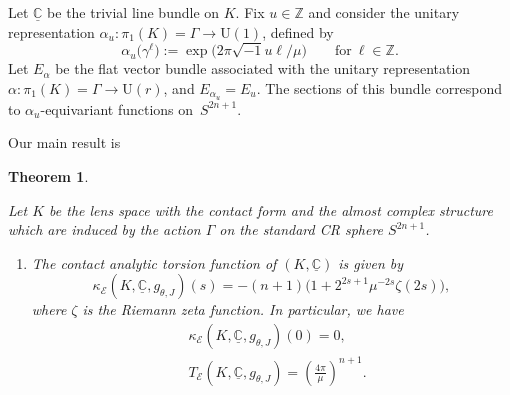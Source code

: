 \documentclass[pdftex]{sigma}
\numberwithin{equation}{section}
\newtheorem{Theorem}{Theorem}[section]
\newcommand{\ii}{\sqrt{-1}}
\newcommand{\RN}{\cE}
\newcommand{\bC}{\mathbb{C}}
\newcommand{\cE}{\mathcal{E}}
\begin{document}
Let $\underline{\bC}$ be the trivial line bundle on $K$.
Fix $u \in \mathbb{Z}$ and consider the unitary representation $\alpha_u \colon \pi_1 (K) = \Gamma \to \mathrm{U} (1)$, defined by
\[
 \alpha_u \big( \gamma^{\ell} \big) := \exp \big( 2 \pi \ii u \ell / \mu \big)
 \qquad \text{for} \ \ell \in \mathbb{Z}
 .
\]
Let $E_{\alpha}$ be the flat vector bundle associated with the unitary representation ${\alpha \colon \pi_1 (K) = \Gamma \! \to \! \mathrm{U} (r)}$, and $E_{\alpha_u} = E_{u}$.
The sections of this bundle correspond to $\alpha_u$-equivariant functions on~$S^{2n+1}$.


Our main result is
\begin{Theorem}
\label{theo:compute-precisely-kappa-on-the-lens-spaces}

Let $K$ be the lens space with
the contact form and the almost complex structure which are induced by the action $\Gamma$ on the standard CR sphere $S^{2n+1}$.
\begin{enumerate}\itemsep=0pt
\item[$(1)$]
 The contact analytic torsion function
 of $(K, \underline{\bC})$
 is given by
 \begin{equation}
 \kappa_\RN ( K , \underline{\bC}, g_{\theta , J} ) (s)
 =
 -(n+1)
 \bigr(
 1
 +
 2^{2s+1}
 \mu^{-2s}
 \zeta (2s)
 \bigl)
 ,
 \label{eq:kappa-on-lens-spaces}
 \end{equation}
 where $\zeta$ is the Riemann zeta function.
 In particular, we have
 \begin{align}
 & \kappa_\RN ( K , \underline{\bC} , g_{\theta , J} ) (0)
 =
 0
 ,
 \label{eq:kappa-at-the-origin-of-the-triv-bundle-on-lens-spaces}
 \\
 & T_\RN ( K , \underline{\bC}, g_{\theta , J} )
 =
 \left(\frac{4 \pi}{\mu}\right)^{n+1}
 .
 \label{eq:Rumin-analytic-torsion-of-the-triv-bundle-on-lens-spaces}
 \end{align}


\end{enumerate}
\end{Theorem}
\end{document}
